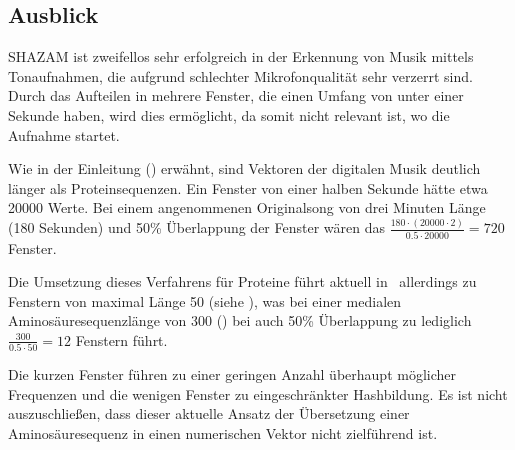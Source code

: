     \subsection*{Ausblick} %
        \label{sub:ausblick}
        SHAZAM ist zweifellos sehr erfolgreich in der Erkennung von Musik mittels Tonaufnahmen, die aufgrund schlechter Mikrofonqualität sehr verzerrt sind. Durch das Aufteilen in mehrere Fenster, die einen Umfang von unter einer Sekunde haben, wird dies ermöglicht, da somit nicht relevant ist, wo die Aufnahme startet.

        Wie in der Einleitung () erwähnt, sind Vektoren der digitalen Musik deutlich länger als Proteinsequenzen. Ein Fenster von einer halben Sekunde hätte etwa 20000 Werte. Bei einem angenommenen Originalsong von drei Minuten Länge (180 Sekunden) und 50\% Überlappung der Fenster wären das $\frac{180 \cdot (20000 \cdot 2)}{0.5 \cdot 20000}=720$ Fenster.

        Die Umsetzung dieses Verfahrens für Proteine führt aktuell in \protfin\ allerdings zu Fenstern von maximal Länge 50 (siehe ), was bei einer medialen Aminosäuresequenzlänge von 300 () bei auch 50\% Überlappung zu lediglich $\frac{300}{0.5 \cdot 50}=12$ Fenstern führt.

        Die kurzen Fenster führen zu einer geringen Anzahl überhaupt möglicher Frequenzen und die wenigen Fenster zu eingeschränkter Hashbildung. Es ist nicht auszuschließen, dass dieser aktuelle Ansatz der Übersetzung einer Aminosäuresequenz in einen numerischen Vektor nicht zielführend ist.

